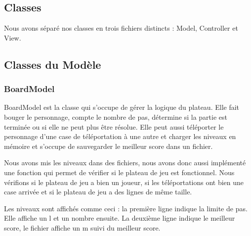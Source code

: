 \documentclass[utf8]{article}
\begin{document}
\begin{large}
\par


\section{Classes}
\indent
\par
Nous avons séparé nos classes en trois fichiers distincts : Model, Controller et View.
\par
\subsection{Classes du Modèle}

\subsubsection{BoardModel}
\indent
\par
BoardModel est la classe qui s'occupe de gérer la logique du plateau. Elle fait
bouger le personnage, compte le nombre de pas, détermine si la partie est
terminée ou si elle ne peut plus être résolue. Elle peut aussi téléporter le
personnage d'une case de téléportation à une autre et charger les niveaux en
mémoire et s'occupe de sauvegarder le meilleur score dans un fichier.
\par
\indent
\par
Nous avons mis les niveaux dans des fichiers, nous avons donc aussi implémenté
une fonction qui permet de vérifier si le plateau de jeu est fonctionnel. Nous
vérifions si le plateau de jeu a bien un joueur, si les téléportations ont bien une
case arrivée et si le plateau de jeu a des lignes de même taille.
\par
Les niveaux sont affichés comme ceci : la première ligne indique la limite de
pas. Elle affiche un l et un nombre ensuite. La deuxième ligne indique le
meilleur score, le fichier affiche un m suivi du meilleur score.
\par


\end{large}
\end{document}
